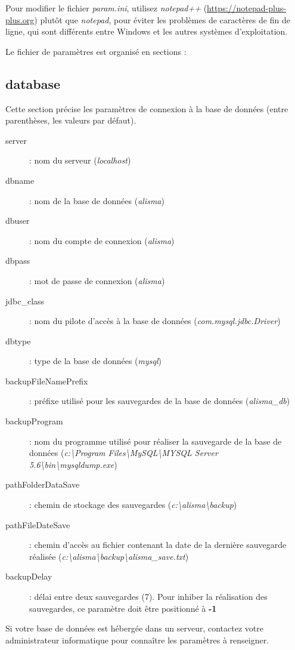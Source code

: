Pour modifier le fichier \textit{param.ini}, utilisez \textit{notepad++} (\url{https://notepad-plus-plus.org}) plutôt que \textit{notepad}, pour éviter les problèmes de caractères de fin de ligne, qui sont différents entre Windows et les autres systèmes d'exploitation.

Le fichier de paramètres est organisé en sections :

\subsection{database}
Cette section précise les paramètres de connexion à la base de données (entre parenthèses, les valeurs par défaut).
\begin{description}
\item [server] : nom du serveur (\textit{localhost})
\item [dbname] : nom de la base de données (\textit{alisma})
\item [dbuser] : nom du compte de connexion (\textit{alisma})
\item [dbpass] : mot de passe de connexion (\textit{alisma})
\item [jdbc\_class] : nom du pilote d'accès à la base de données (\textit{com.mysql.jdbc.Driver})
\item [dbtype] : type de la base de données (\textit{mysql})
\item [backupFileNamePrefix] : préfixe utilisé pour les sauvegardes de la base de données (\textit{alisma\_db})
\item [backupProgram] : nom du programme utilisé pour réaliser la sauvegarde de la base de données (\textit{c:\textbackslash{}Program Files\textbackslash{}MySQL\textbackslash{}MYSQL Server 5.6\textbackslash{}bin\textbackslash{}mysqldump.exe})
\item [pathFolderDataSave] : chemin de stockage des sauvegardes (\textit{c:\textbackslash{}alisma\textbackslash{}backup})
\item [pathFileDateSave] : chemin d'accès au fichier contenant la date de la dernière sauvegarde réalisée (\textit{c:\textbackslash{}alisma\textbackslash{}backup\textbackslash{}alisma\_save.txt})
\item [backupDelay] : délai entre deux sauvegardes (7). Pour inhiber la réalisation des sauvegardes, ce paramètre doit être positionné à \textbf{-1}
\end{description}

Si votre base de données est hébergée dans un serveur, contactez votre administrateur informatique pour connaître les paramètres à renseigner.

